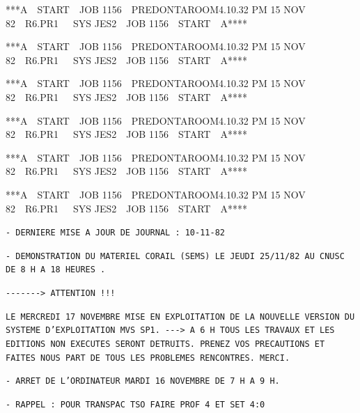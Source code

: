 {}

{\fontsize{4.4}{5.5}\selectfont\ttfamily ****A\ \ START\ \ JOB 1156\ \ PREDONTA\hfill ROOM\hfill 4.10.32 PM 15 NOV 82\ \ R6.PR1\ \ \ SYS JES2\ \ JOB 1156\ \ START\ \ A****}

{\fontsize{4.4}{5.5}\selectfont\ttfamily ****A\ \ START\ \ JOB 1156\ \ PREDONTA\hfill ROOM\hfill 4.10.32 PM 15 NOV 82\ \ R6.PR1\ \ \ SYS JES2\ \ JOB 1156\ \ START\ \ A****}

{\fontsize{4.4}{5.5}\selectfont\ttfamily ****A\ \ START\ \ JOB 1156\ \ PREDONTA\hfill ROOM\hfill 4.10.32 PM 15 NOV 82\ \ R6.PR1\ \ \ SYS JES2\ \ JOB 1156\ \ START\ \ A****}

{\fontsize{4.4}{5.5}\selectfont\ttfamily ****A\ \ START\ \ JOB 1156\ \ PREDONTA\hfill ROOM\hfill 4.10.32 PM 15 NOV 82\ \ R6.PR1\ \ \ SYS JES2\ \ JOB 1156\ \ START\ \ A****}

{\fontsize{4.4}{5.5}\selectfont\ttfamily ****A\ \ START\ \ JOB 1156\ \ PREDONTA\hfill ROOM\hfill 4.10.32 PM 15 NOV 82\ \ R6.PR1\ \ \ SYS JES2\ \ JOB 1156\ \ START\ \ A****}

{\fontsize{4.4}{5.5}\selectfont\ttfamily ****A\ \ START\ \ JOB 1156\ \ PREDONTA\hfill ROOM\hfill 4.10.32 PM 15 NOV 82\ \ R6.PR1\ \ \ SYS JES2\ \ JOB 1156\ \ START\ \ A****}

\texttt{- DERNIERE MISE A JOUR DE JOURNAL : 10-11-82}

\texttt{- DEMONSTRATION DU MATERIEL CORAIL (SEMS) LE JEUDI 25/11/82 AU CNUSC DE 8 H A 18 HEURES .}

\texttt{-{}-{}-{}-{}-{}-{}-> ATTENTION !!!}

\texttt{LE MERCREDI 17 NOVEMBRE MISE EN EXPLOITATION DE LA NOUVELLE VERSION DU SYSTEME D'EXPLOITATION MVS SP1. -{}-{}-> A 6 H TOUS LES TRAVAUX ET LES EDITIONS NON EXECUTES SERONT DETRUITS. PRENEZ VOS PRECAUTIONS ET FAITES NOUS PART DE TOUS LES PROBLEMES RENCONTRES. MERCI.}

\texttt{- ARRET DE L'ORDINATEUR MARDI 16 NOVEMBRE DE 7 H A 9 H.}

\texttt{- RAPPEL : POUR TRANSPAC TSO FAIRE PROF 4 ET SET 4:0}
